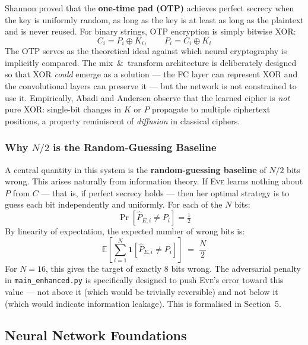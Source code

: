 \documentclass[12pt, a4paper]{article}
\newcommand{\eve}{\textsc{Eve}}
\newcommand{\code}[1]{\texttt{\color{CodeRed}#1}}
\begin{document}
Shannon proved that the \textbf{one-time pad (OTP)} achieves perfect
secrecy when the key is uniformly random, as long as the key is at least
as long as the plaintext and is never reused. For binary strings, OTP
encryption is simply bitwise XOR:
%
\begin{equation}
  C_i = P_i \oplus K_i, \qquad
  P_i = C_i \oplus K_i
  \label{eq:otp}
\end{equation}
%
The OTP serves as the theoretical ideal against which neural cryptography
is implicitly compared. The mix~\&~transform architecture is deliberately
designed so that XOR \emph{could} emerge as a solution — the FC layer can
represent XOR and the convolutional layers can preserve it — but the
network is not constrained to use it. Empirically, Abadi and Andersen
observe that the learned cipher is \emph{not} pure XOR: single-bit
changes in $K$ or $P$ propagate to multiple ciphertext positions, a
property reminiscent of \emph{diffusion} in classical ciphers.

\subsubsection*{Why $N/2$ is the Random-Guessing Baseline}
\label{subsubsec:random_baseline}

A central quantity in this system is the \textbf{random-guessing baseline}
of $N/2$ bits wrong. This arises naturally from information theory. If
\eve{} learns nothing about $P$ from $C$ — that is, if perfect secrecy
holds — then her optimal strategy is to guess each bit independently and
uniformly. For each of the $N$ bits:
%
\begin{equation}
  \Pr[\hat{P}_{E,i} \neq P_i] = \tfrac{1}{2}
  \label{eq:bit_error}
\end{equation}
%
By linearity of expectation, the expected number of wrong bits is:
%
\begin{equation}
  \mathbb{E}\!\left[\sum_{i=1}^{N} \mathbf{1}[\hat{P}_{E,i} \neq P_i]\right]
  \;=\; \frac{N}{2}
  \label{eq:random_baseline}
\end{equation}
%
For $N = 16$, this gives the target of exactly $8$ bits wrong. The
adversarial penalty in \code{main\_enhanced.py} is specifically designed
to push \eve{}'s error toward this value — not above it (which would
be trivially reversible) and not below it (which would indicate information
leakage). This is formalised in Section~5.

\subsection{Neural Network Foundations}
\label{subsec:nn}
\end{document}
